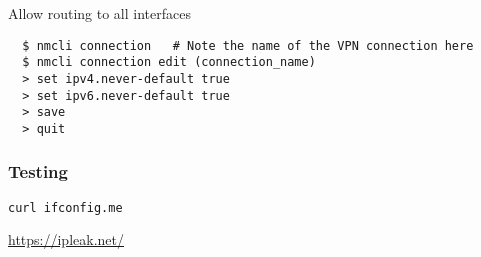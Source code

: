 Allow routing to all interfaces
\begin{verbatim}
  $ nmcli connection   # Note the name of the VPN connection here
  $ nmcli connection edit (connection_name)
  > set ipv4.never-default true
  > set ipv6.never-default true
  > save
  > quit
\end{verbatim}


\subsubsection{Testing}
\begin{verbatim}
curl ifconfig.me
\end{verbatim}

\url{https://ipleak.net/}


